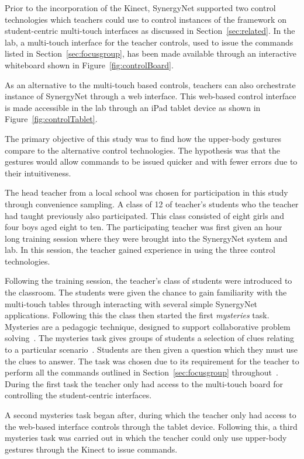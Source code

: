 \documentclass[manuscript, review, screen]{acmart}
\begin{document}
Prior to the incorporation of the Kinect, SynergyNet supported two control technologies which teachers could use to control instances of the framework on student-centric multi-touch interfaces as discussed in Section~\ref{sec:related}.
In the lab, a multi-touch interface for the teacher controls, used to issue the commands listed in Section~\ref{sec:focusgroup}, has been made available through an interactive whiteboard shown in Figure~\ref{fig:controlBoard}.

As an alternative to the multi-touch based controls, teachers can also orchestrate instance of SynergyNet through a web interface.
This web-based control interface is made accessible in the lab through an iPad tablet device as shown in Figure~\ref{fig:controlTablet}.

The primary objective of this study was to find how the upper-body gestures compare to the alternative control technologies.
The hypothesis was that the gestures would allow commands to be issued quicker and with fewer errors due to their intuitiveness.

The head teacher from a local school was chosen for participation in this study through convenience sampling.
A class of 12 of teacher's students who the teacher had taught previously also participated.
This class consisted of eight girls and four boys aged eight to ten.
The participating teacher was first given an hour long training session where they were brought into the SynergyNet system and lab.  
In this session, the teacher gained experience in using the three control technologies.

Following the training session, the teacher's class of students were introduced to the classroom.
The students were given the chance to gain familiarity with the multi-touch tables through interacting with several simple SynergyNet applications.
Following this the class then started the first \textit{mysteries} task.
Mysteries are a pedagogic technique, designed to support collaborative problem solving~\cite{Leat2002}.
The mysteries task gives groups of students a selection of clues relating to a particular scenario~\cite{Higgins2011b}.
Students are then given a question which they must use the clues to answer.
The task was chosen due to its requirement for the teacher to perform all the commands outlined in Section~\ref{sec:focusgroup} throughout~\cite{Mercier2012}.
During the first task the teacher only had access to the multi-touch board for controlling the student-centric interfaces.

A second mysteries task began after, during which the teacher only had access to the web-based interface controls through the tablet device.
Following this, a third mysteries task was carried out in which the teacher could only use upper-body gestures through the Kinect to issue commands.
\end{document}
